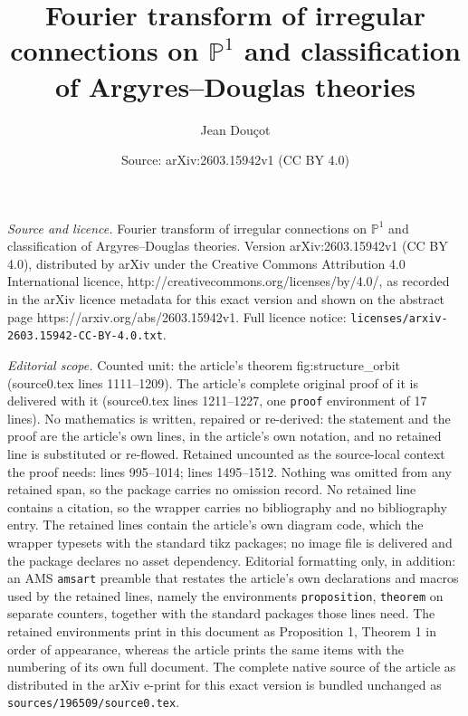 \documentclass[10pt,a4paper]{amsart}
\title{Fourier transform of irregular connections on $\mathbb P^1$ and classification of Argyres--Douglas theories}
\author{Jean Dou\c{c}ot}
\date{Source: arXiv:2603.15942v1 (CC BY 4.0)}
\begin{document}
\maketitle

\noindent\emph{Source and licence.} Fourier transform of irregular connections on $\mathbb P^1$ and classification of Argyres--Douglas theories. Version arXiv:2603.15942v1 (CC BY 4.0), distributed by arXiv under the Creative Commons Attribution 4.0 International licence, http://creativecommons.org/licenses/by/4.0/, as recorded in the arXiv licence metadata for this exact version and shown on the abstract page https://arxiv.org/abs/2603.15942v1. Full licence notice: \texttt{licenses/arxiv-2603.15942-CC-BY-4.0.txt}.\par\smallskip

\noindent\textit{Editorial scope.} Counted unit: the article's theorem fig:structure\_orbit (source0.tex lines 1111--1209). The article's complete original proof of it is delivered with it (source0.tex lines 1211--1227, one \texttt{proof} environment of 17 lines). No mathematics is written, repaired or re-derived: the statement and the proof are the article's own lines, in the article's own notation, and no retained line is substituted or re-flowed.  Retained uncounted as the source-local context the proof needs: lines 995--1014; lines 1495--1512.  Nothing was omitted from any retained span, so the package carries no omission record.  No retained line contains a citation, so the wrapper carries no bibliography and no bibliography entry.  The retained lines contain the article's own diagram code, which the wrapper typesets with the standard tikz packages; no image file is delivered and the package declares no asset dependency.  Editorial formatting only, in addition: an AMS \texttt{amsart} preamble that restates the article's own declarations and macros used by the retained lines, namely the environments \texttt{proposition}, \texttt{theorem} on separate counters, together with the standard packages those lines need.  The retained environments print in this document as Proposition 1, Theorem 1 in order of appearance, whereas the article prints the same items with the numbering of its own full document.  The complete native source of the article as distributed in the arXiv e-print for this exact version is bundled unchanged as \texttt{sources/196509/source0.tex}.
\end{document}
